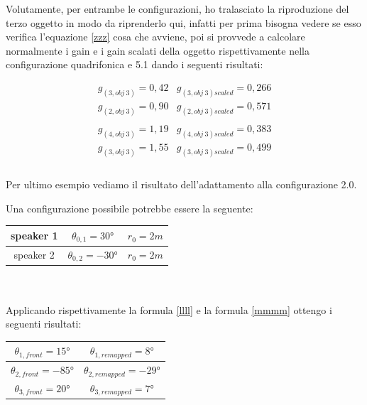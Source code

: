 \documentclass[12pt,a4paper]{report}
\begin{document}
Volutamente, per entrambe le configurazioni, ho tralasciato la riproduzione del terzo oggetto in modo da riprenderlo qui, infatti per prima bisogna vedere se esso verifica l'equazione \ref{zzz} cosa che avviene, poi si provvede a calcolare normalmente i gain e i gain scalati della oggetto rispettivamente nella configurazione quadrifonica e 5.1 dando i seguenti risultati:

\begin{equation}
\begin{matrix}
g_{(3,obj\ 3)} = 0,42 & g_{(3,obj\ 3)scaled} = 0,266\\
g_{(2,obj\ 3)} = 0,90 & g_{(2,obj\ 3)scaled} = 0,571\\
\\
g_{(4,obj\ 3)} = 1,19 & g_{(4,obj\ 3)scaled} = 0,383\\
g_{(3,obj\ 3)} = 1,55 & g_{(3,obj\ 3)scaled} = 0,499\\

\end{matrix}
\label{gscalatiesempiooggetto3}
\end{equation} \\



Per ultimo esempio vediamo il risultato dell'adattamento alla configurazione 2.0.

Una configurazione possibile potrebbe essere la seguente:

\begin{tabular}{|c|c|c|}
\hline
speaker 1 & $\theta_{0,1}=30°$ & $r_0=2m$\\
\hline
speaker 2 & $\theta_{0,2}=-30°$ & $r_0=2m$\\
\hline
\end{tabular} \\
\\

Applicando rispettivamente la formula \ref{llll} e la formula \ref{mmmm} ottengo i seguenti risultati:


\begin{tabular}{|c|c|}
\hline
$\theta_{1,front} = 15°$     & $\theta_{1,remapped} =  8°  $   \\
\hline
$\theta_{2,front} = -85°$     & $\theta_{2,remapped} = -29° $     \\
\hline
$\theta_{3,front} = 20°$    & $ \theta_{3,remapped} =  7° $    \\
\hline
\end{tabular} \\
\\
\end{document}
